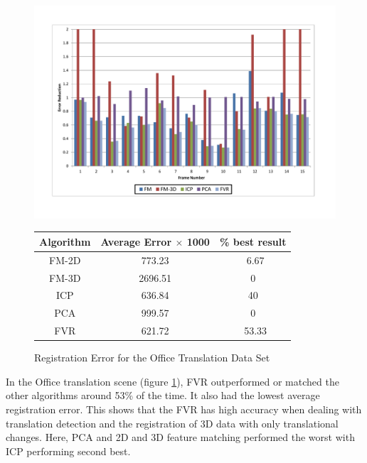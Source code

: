 \begin{figure}
\centering
\includegraphics[width=6in]{images/results/Office_Texture_Translation}
\caption{Registration Error for the Office Translation Data Set}
\label{fig:PET12}

\begin{tabular}{ccc}
\hline
\textbf{Algorithm} & \textbf{Average Error $\times$ 1000} & \textbf{\% best result}\\ \hline
FM-2D	& 773.23 & ~6.67\\
FM-3D	& 2696.51 & 0\\
ICP		& 636.84 & 40\\
PCA		& 999.57 & 0\\
FVR		& 621.72 & ~53.33\\
\end{tabular}
\end{figure} 


In the Office translation scene (figure \ref{fig:PET12}), FVR outperformed or matched the other algorithms around 53\% of the time. It also had the lowest average registration error. This shows that the FVR has high accuracy when dealing with translation detection and the registration of 3D data with only translational changes. Here, PCA and 2D and 3D feature matching performed the worst with ICP performing second best. \\

